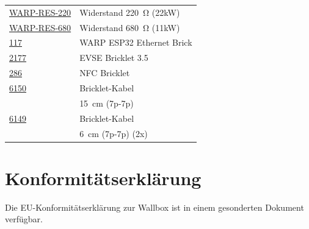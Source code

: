 \documentclass[a4paper,10pt]{article}
\begin{document}
\begin{multicols*}{2}
{\begin{tabular}{ll}
        \href{https://www.tinkerforge.com/de/shop/warp/warp3-spare-parts/}{WARP-RES-220}											& Widerstand \SI{220}{\ohm} (22kW)           \\
        \cmidrule(lr{0.5em}){1-2}
        \href{https://www.tinkerforge.com/de/shop/warp/warp3-spare-parts/}{WARP-RES-680}											& Widerstand \SI{680}{\ohm} (11kW)            \\
        \cmidrule(lr{0.5em}){1-2}
        \href{https://www.tinkerforge.com/de/shop/warp/warp3-spare-parts/}{117}														& WARP ESP32 Ethernet Brick                 \\
        \cmidrule(lr{0.5em}){1-2}
        \href{https://www.tinkerforge.com/de/shop/warp/warp3-spare-parts/}{2177}													& EVSE Bricklet 3.5                    \\
        \cmidrule(lr{0.5em}){1-2}
        \href{https://www.tinkerforge.com/de/shop/warp/warp3-spare-parts/}{286}  				                                    & NFC Bricklet                         \\
        \cmidrule(lr{0.5em}){1-2}
        \href{https://www.tinkerforge.com/de/shop/warp/warp3-spare-parts/}{6150}													& Bricklet-Kabel                       \\
                                                                                                                                    & \SI{15}{\centi\meter} (7p-7p)        \\
        \cmidrule(lr{0.5em}){1-2}
        \href{https://www.tinkerforge.com/de/shop/warp/warp3-spare-parts/}{6149}													& Bricklet-Kabel                       \\
                                                                                                                                    & \SI{6}{\centi\meter} (7p-7p) (2x)\\
        \bottomrule
    \end{tabular}
	}

    \section{Konformitätserklärung}
    Die EU-Konformitätserklärung zur Wallbox ist in einem gesonderten Dokument verfügbar.


\end{multicols*}
\end{document}
